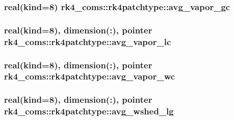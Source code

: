 \subsubsection[{\texorpdfstring{avg\+\_\+vapor\+\_\+gc}{avg_vapor_gc}}]{\setlength{\rightskip}{0pt plus 5cm}real(kind=8) rk4\+\_\+coms\+::rk4patchtype\+::avg\+\_\+vapor\+\_\+gc}\hypertarget{structrk4__coms_1_1rk4patchtype_af1544e566b39e6b6e206fc22e90a8b29}{}\label{structrk4__coms_1_1rk4patchtype_af1544e566b39e6b6e206fc22e90a8b29}
\subsubsection[{\texorpdfstring{avg\+\_\+vapor\+\_\+lc}{avg_vapor_lc}}]{\setlength{\rightskip}{0pt plus 5cm}real(kind=8), dimension(\+:), pointer rk4\+\_\+coms\+::rk4patchtype\+::avg\+\_\+vapor\+\_\+lc}\hypertarget{structrk4__coms_1_1rk4patchtype_acea041337343e625db3c1d6fce434694}{}\label{structrk4__coms_1_1rk4patchtype_acea041337343e625db3c1d6fce434694}
\subsubsection[{\texorpdfstring{avg\+\_\+vapor\+\_\+wc}{avg_vapor_wc}}]{\setlength{\rightskip}{0pt plus 5cm}real(kind=8), dimension(\+:), pointer rk4\+\_\+coms\+::rk4patchtype\+::avg\+\_\+vapor\+\_\+wc}\hypertarget{structrk4__coms_1_1rk4patchtype_a55a8b0a5fd4019d12159c9e48025db0b}{}\label{structrk4__coms_1_1rk4patchtype_a55a8b0a5fd4019d12159c9e48025db0b}
\subsubsection[{\texorpdfstring{avg\+\_\+wshed\+\_\+lg}{avg_wshed_lg}}]{\setlength{\rightskip}{0pt plus 5cm}real(kind=8), dimension(\+:), pointer rk4\+\_\+coms\+::rk4patchtype\+::avg\+\_\+wshed\+\_\+lg}\hypertarget{structrk4__coms_1_1rk4patchtype_a018e4fa2fc1e1fc551ab51a4e0521839}{}\label{structrk4__coms_1_1rk4patchtype_a018e4fa2fc1e1fc551ab51a4e0521839}

